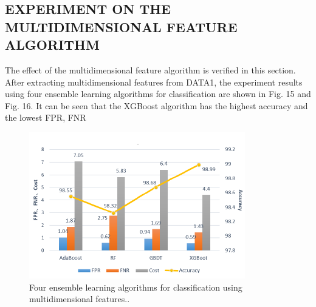 \documentclass{ieeeaccess}
\begin{document}
\subsection{EXPERIMENT ON THE MULTIDIMENSIONAL FEATURE
ALGORITHM}
The effect of the multidimensional feature algorithm is
verified in this section. After extracting multidimensional
features from DATA1, the experiment results using four
ensemble learning algorithms for classification are shown
in Fig. 15 and Fig. 16. It can be seen that the XGBoost
algorithm has the highest accuracy and the lowest FPR, FNR

\begin{figure}
    \centering
    \includegraphics[width=\linewidth]{figure15.png}
    \caption{Four ensemble learning algorithms for classification using
multidimensional features..}
    \label{fig:15}
\end{figure}
\end{document}
